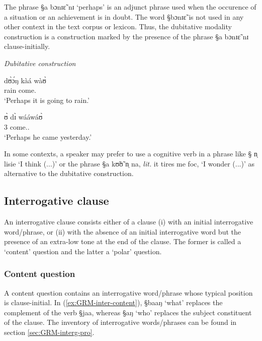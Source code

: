 The phrase {\S a bɔnɪɛ̃ nɪ} `perhaps' is an adjunct phrase used when the
occurence of a situation  or an achievement  is in doubt. The word {\S bɔnɪɛ̃}
is not
used in any other context in the text corpus or lexicon. Thus, the dubitative
modality construction is a construction marked by the presence of the phrase
{\S a bɔnɪɛ̃ nɪ} clause-initially.


\begin{exe}
\ex\label{ex:GRM-modal}{\it Dubitative construction}
\begin{xlist}
\ex\label{ex:GRM-modal-45.5}
  dʊ̀ɔ́ŋ kàá wàʊ̀\\
{\dub} rain {\fut} come.{\foc}\\
\glt  `Perhaps it is going to rain.'


\ex\label{ex:GRM-modal-45.3}
 ʊ̀ dɪ̀ wááwáʊ̀\\
{\dub}  {3\sg} {\hest} come.{\pfv.\foc}\\
\glt `Perhaps he came yesterday.' 

\end{xlist}
\end{exe}

In some contexts, a speaker may prefer  to use a cognitive verb in a phrase
like {\S
n̩ lisie} `I think (...)'  or
the phrase {\S a kʊ̃ʊ̃ n̩ na}, {\it lit.} it tires me {\sc foc},  `I wonder
(...)' as alternative to the dubitative
construction. 



\subsection{Interrogative clause}
\label{sec:GRM-interr-clause}

An interrogative clause consists either of a clause (i) with an initial
interrogative word/phrase, or (ii) with the absence of an initial interrogative
word but the presence of an extra-low tone at the end of the clause. The former
is called a `content' question and the latter a `polar' question. 

\subsubsection{Content question}
\label{sec:GRM-interr-content}

A content question contains an interrogative word/phrase whose typical position
is clause-initial. In (\ref{ex:GRM-inter-content}), {\S baaŋ} `what' replaces
the complement of the verb {\S jaa}, whereas {\S aŋ} `who'  replaces
the subject constituent of the clause. The inventory of interrogative
words/phrases can
be found in section \ref{sec:GRM-interg-pro}.

